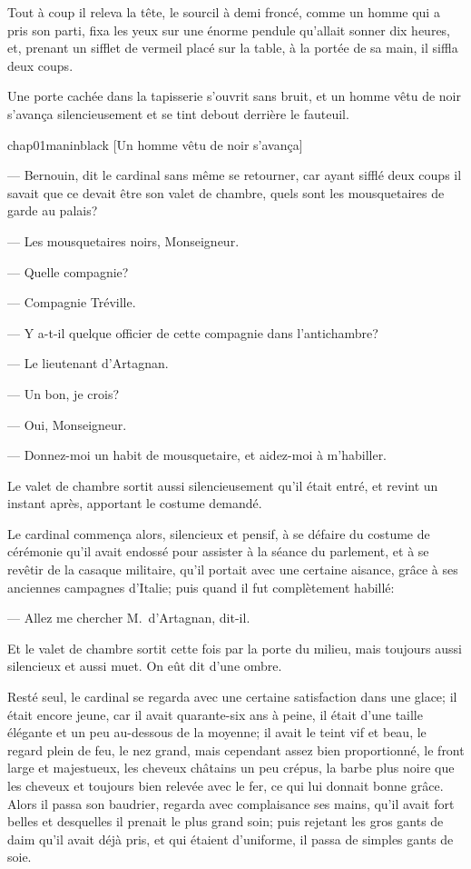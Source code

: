 Tout à coup il releva la tête, le sourcil à demi froncé, comme un homme qui a pris son parti, fixa les yeux sur une énorme pendule qu'allait sonner dix heures, et, prenant un sifflet de vermeil placé sur la table, à la portée de sa main, il siffla deux coups.

Une porte cachée dans la tapisserie s'ouvrit sans bruit, et un homme vêtu de noir s'avança silencieusement et se tint debout derrière le fauteuil.

\begin{bwbigpic}
	[\basicscale] 
	{chap01maninblack}
	[Un homme vêtu de noir s'avança]
\end{bwbigpic}

— Bernouin, dit le cardinal sans même se retourner, car ayant sifflé deux coups il savait que ce devait être son valet de chambre, quels sont les mousquetaires de garde au palais?

— Les mousquetaires noirs, Monseigneur.

— Quelle compagnie?

— Compagnie Tréville.

— Y a-t-il quelque officier de cette compagnie dans l'antichambre?

— Le lieutenant d'Artagnan.

— Un bon, je crois?

— Oui, Monseigneur.

— Donnez-moi un habit de mousquetaire, et aidez-moi à m'habiller.

Le valet de chambre sortit aussi silencieusement qu'il était entré, et revint un instant après, apportant le costume demandé.

Le cardinal commença alors, silencieux et pensif, à se défaire du costume de cérémonie qu'il avait endossé pour assister à la séance du parlement, et à se revêtir de la casaque militaire, qu'il portait avec une certaine aisance, grâce à ses anciennes campagnes d'Italie; puis quand il fut complètement habillé:

— Allez me chercher M.~d'Artagnan, dit-il.

Et le valet de chambre sortit cette fois par la porte du milieu, mais toujours aussi silencieux et aussi muet. On eût dit d'une ombre.

Resté seul, le cardinal se regarda avec une certaine satisfaction dans une glace; il était encore jeune, car il avait quarante-six ans à peine, il était d'une taille élégante et un peu au-dessous de la moyenne; il avait le teint vif et beau, le regard plein de feu, le nez grand, mais cependant assez bien proportionné, le front large et majestueux, les cheveux châtains un peu crépus, la barbe plus noire que les cheveux et toujours bien relevée avec le fer, ce qui lui donnait bonne grâce. Alors il passa son baudrier, regarda avec complaisance ses mains, qu'il avait fort belles et desquelles il prenait le plus grand soin; puis rejetant les gros gants de daim qu'il avait déjà pris, et qui étaient d'uniforme, il passa de simples gants de soie.

